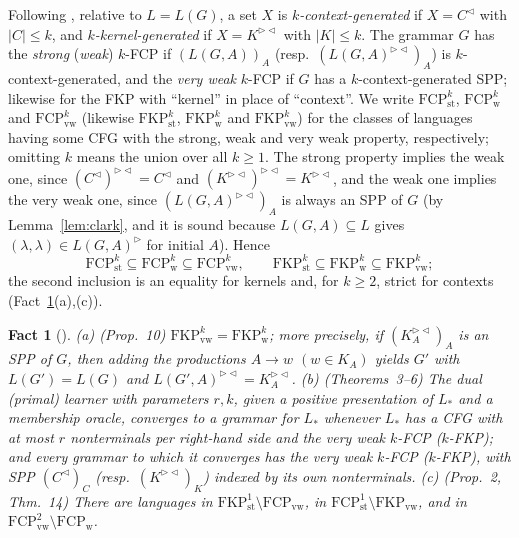 \documentclass[11pt]{article}
\numberwithin{equation}{section}
\theoremstyle{plain}
\newtheorem{fact}[theorem]{Fact}
\theoremstyle{definition}
\theoremstyle{remark}
\theoremstyle{plain}
\newcommand{\eps}{\lambda}
\newcommand{\R}{^{\rhd}}
\newcommand{\Lc}{^{\lhd}}
\newcommand{\RL}{^{\rhd\lhd}}
\newcommand{\FCP}[2]{\mathrm{FCP}^{#1}_{\mathrm{#2}}}
\newcommand{\FKP}[2]{\mathrm{FKP}^{#1}_{\mathrm{#2}}}
\begin{document}
Following \citet[Sec.~3]{ky2017}, relative to $L=L(G)$, a set $X$ is
\emph{$k$-context-generated} if $X=C\Lc$ with $|C|\le k$, and
\emph{$k$-kernel-generated} if $X=K\RL$ with $|K|\le k$.  The grammar $G$ has
the \emph{strong} (\emph{weak}) $k$-FCP if $(L(G,A))_A$
(resp.\ $(L(G,A)\RL)_A$) is $k$-context-generated, and the \emph{very weak}
$k$-FCP if $G$ has a $k$-context-generated SPP; likewise for the FKP with
``kernel'' in place of ``context''.  We write $\FCP{k}{st}$, $\FCP{k}{w}$
and $\FCP{k}{vw}$ (likewise $\FKP{k}{st}$, $\FKP{k}{w}$ and $\FKP{k}{vw}$)
for the classes of languages having some CFG with the strong, weak and very
weak property, respectively; omitting $k$ means the union over all $k\ge1$.
The strong property implies the weak one, since $(C\Lc)\RL=C\Lc$ and
$(K\RL)\RL=K\RL$, and the weak one implies the very weak one, since
$(L(G,A)\RL)_A$ is always an SPP of $G$ (by Lemma~\ref{lem:clark}, and it
is sound because $L(G,A)\subseteq L$ gives $(\eps,\eps)\in L(G,A)\R$ for
initial $A$).  Hence
\[
\FCP{k}{st}\subseteq\FCP{k}{w}\subseteq\FCP{k}{vw},\qquad
\FKP{k}{st}\subseteq\FKP{k}{w}\subseteq\FKP{k}{vw};
\]
the second inclusion is an equality for kernels and, for $k\ge2$, strict for contexts
(Fact~\ref{fact:ky}(a),(c)).

\begin{fact}[\citealp{ky2017}]\label{fact:ky}
(a) (Prop.~10) $\FKP{k}{vw}=\FKP{k}{w}$; more precisely, if $(K_A\RL)_A$ is
an SPP of $G$, then adding the productions $A\to w$ $(w\in K_A)$ yields
$G'$ with $L(G')=L(G)$ and $L(G',A)\RL=K_A\RL$.
(b) (Theorems~3--6) The dual (primal) learner with parameters $r,k$, given a
positive presentation of $L_*$ and a membership oracle, converges to a
grammar for $L_*$ whenever $L_*$ has a CFG with at most $r$ nonterminals per
right-hand side and the very weak $k$-FCP ($k$-FKP); and every grammar to
which it converges has the very weak $k$-FCP ($k$-FKP), with SPP
$(C\Lc)_C$ (resp.\ $(K\RL)_K$) indexed by its own nonterminals.
(c) (Prop.~2, Thm.~14) There are languages in $\FKP1{st}\setminus\FCP{}{vw}$, in
$\FCP1{st}\setminus\FKP{}{vw}$, and in $\FCP2{vw}\setminus\FCP{}{w}$.
\end{fact}
\end{document}
